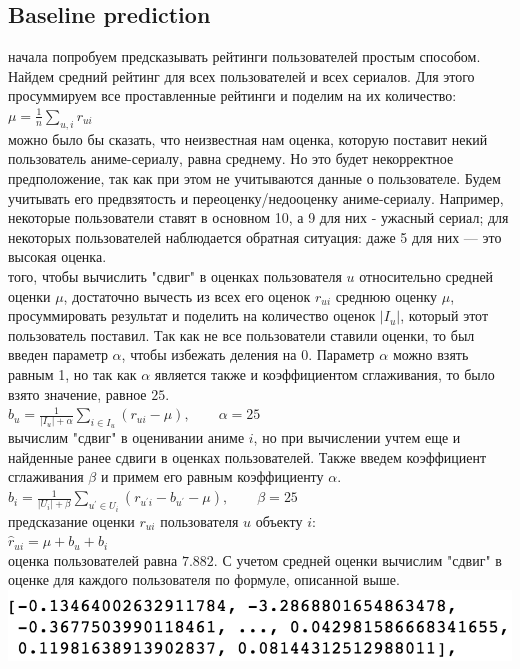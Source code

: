 \documentclass{article}
\newcommand\tab[1][1cm]{\hspace*{#1}}
\begin{document}
\subsection{Baseline prediction}
 начала попробуем предсказывать рейтинги пользователей простым способом. Найдем средний рейтинг для всех пользователей и всех сериалов. Для этого просуммируем все проставленные рейтинги и поделим на их количество:\\
\tab$\mu=\frac{1}{n}\sum_{u,i}r_{ui}$\\
 можно было бы сказать, что неизвестная нам оценка, которую поставит некий пользователь аниме-сериалу, равна среднему. Но это будет некорректное предположение, так как при этом не учитываются данные о пользователе.  Будем учитывать его предвзятость и переоценку/недооценку аниме-сериалу. Например, некоторые пользователи ставят в основном 10, а 9 для них - ужасный сериал; для некоторых пользователей наблюдается обратная ситуация: даже 5 для них — это высокая оценка.\\
 того, чтобы вычислить "сдвиг" в оценках пользователя $u$ относительно средней оценки $\mu$, достаточно вычесть из всех его оценок $r_{ui}$ среднюю оценку $\mu$, просуммировать результат и поделить на количество оценок $|I_u|$, который этот пользователь поставил. Так как не все пользователи ставили оценки, то был введен параметр $\alpha$, чтобы избежать деления на 0. Параметр $\alpha$ можно взять равным 1, но так как $\alpha$ является также и коэффициентом сглаживания, то было взято значение, равное $25$.\\
\tab$b_u=\frac{1}{|I_u|+\alpha}\sum_{i\in{}I_u}(r_{ui} - \mu), \qquad \alpha=25$\\
 вычислим "сдвиг" в оценивании аниме $i$, но при вычислении учтем еще и найденные ранее сдвиги в оценках пользователей. Также введем коэффициент сглаживания $\beta$ и примем его равным коэффициенту $\alpha$.\\
\tab$b_i=\frac{1}{|U_i|+\beta}\sum_{u^\prime\in{}U_i}(r_{u^\prime{}i} - b_{u^\prime} - \mu),  \qquad \beta=25$\\
 предсказание оценки $r_{ui}$ пользователя $u$ объекту $i$:\\
\tab$\hat{r}_{ui}=\mu+b_u+b_i$\\
 оценка пользователей равна $7.882$. С учетом средней оценки вычислим "сдвиг" в оценке для каждого пользователя по формуле, описанной выше.\\
\tab\includegraphics[scale=0.8]{f12.png}\\
\end{document}
